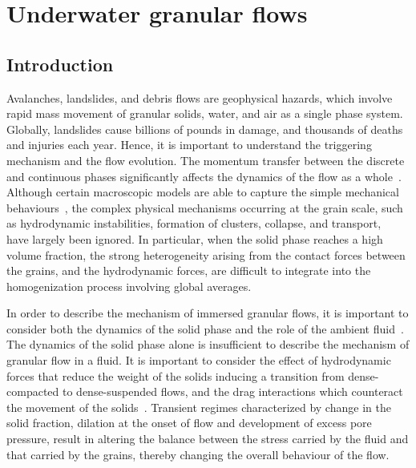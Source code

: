 \chapter{Underwater granular flows}

\ifpdf
    \graphicspath{{Chapter6/figs/raster/}{Chapter6/figs/pdf/}{Chapter6/figs/}}
\else
    \graphicspath{{Chapter6/figs/vector/}{Chapter6/figs/}}
\fi

\section{Introduction}
Avalanches, landslides, and debris flows are geophysical hazards, which involve 
rapid mass movement of granular solids, water, and air as a single phase 
system. Globally, landslides cause billions of pounds in damage, and thousands 
of deaths and injuries each year. Hence, it is important to understand the 
triggering mechanism and the flow evolution. The momentum transfer between the 
discrete and continuous phases significantly affects the dynamics of the flow 
as a whole~\citep{Topin2012}. Although certain macroscopic models are able to 
capture the simple mechanical behaviours~\citep{Peker2007}, the complex 
physical mechanisms occurring at the grain scale, such as hydrodynamic 
instabilities, 
formation of clusters, collapse, and transport,~\citep{Topin2011} have largely 
been ignored. In particular, when the solid phase reaches a high volume 
fraction, the strong heterogeneity arising from the contact forces between the 
grains, and the hydrodynamic forces, are difficult to integrate into the 
homogenization process involving global averages. 

In order to describe the mechanism of immersed 
granular flows, it is important to consider both the dynamics of the solid 
phase and the role of the ambient fluid~\citep{Denlinger2001}. The dynamics of 
the solid phase alone is insufficient to describe the mechanism of granular 
flow in a fluid. It is important to consider the effect of hydrodynamic forces 
that reduce the weight of the solids inducing a transition from dense-compacted 
to dense-suspended flows, and the drag interactions which counteract the 
movement of the solids~\citep{Meruane2010}. Transient regimes characterized by 
change in the solid fraction, dilation at the onset of flow and development of 
excess pore pressure, result in altering the balance between the stress carried 
by the fluid and that carried by the grains, thereby changing the overall 
behaviour of the flow. 


